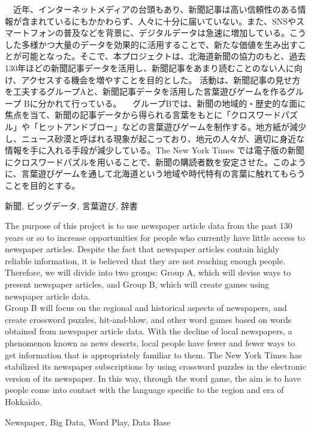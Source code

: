 \documentclass[openany, 11pt,papersize,dvipdfm]{jsbook}
\begin{document}
%
\maketitle

\frontmatter

\begin{jabstract}
　近年、インターネットメディアの台頭もあり、新聞記事は高い信頼性のある情報が含まれているにもかかわらず、人々に十分に届いていない。また、SNSやスマートフォンの普及などを背景に、デジタルデータは急速に増加している。こうした多様かつ大量のデータを効果的に活用することで、新たな価値を生み出すことが可能となった。そこで、本プロジェクトは、北海道新聞の協力のもと、過去130年ほどの新聞記事データを活用し、新聞記事をあまり読むことのない人に向け、アクセスする機会を増やすことを目的とした。
活動は、新聞記事の見せ方を工夫するグループAと、新聞記事データを活用した言葉遊びゲームを作るグループ Bに分かれて行っている。
　グループBでは、新聞の地域的・歴史的な面に焦点を当て、新聞の記事データから得られる言葉をもとに「クロスワードパズル」や「ヒットアンドブロー」などの言葉遊びゲームを制作する。地方紙が減少し、ニュース砂漠と呼ばれる現象が起こっており、地元の人々が、適切に身近な情報を手に入れる手段が減少している。The New York Times では電子版の新聞にクロスワードパズルを用いることで、新聞の購読者数を安定させた。このように、言葉遊びゲームを通して北海道という地域や時代特有の言葉に触れてもらうことを目的とする。
\begin{jkeyword}
新聞, ビッグデータ, 言葉遊び, 辞書
\end{jkeyword}
\end{jabstract}

\begin{eabstract} The purpose of this project is to use newspaper article data from the past 130 years or so to increase opportunities for people who
currently have little access to newspaper articles. Despite the fact that newspaper articles contain highly reliable information, it is
believed that they are not reaching enough people. Therefore, we will divide into two groups: Group A, which will devise ways to
present newspaper articles, and Group B, which will create games using newspaper article data.\\
Group B will focus on the regional and historical aspects of newspapers, and create crossword puzzles, hit-and-blow, and other word games based on words obtained from newspaper article data. With the decline of local newspapers, a phenomenon known as news deserts, local people have fewer and fewer ways to get information that is appropriately familiar to them. The New York Times has stabilized its newspaper subscriptions by using crossword puzzles in the electronic version of its newspaper.
In this way, through the word game, the aim is to have people come into contact with the language specific to the region and era of Hokkaido.
\begin{ekeyword}
Newspaper, Big Data, Word Play, Data Base
\end{ekeyword}
\end{eabstract}
\end{document}

